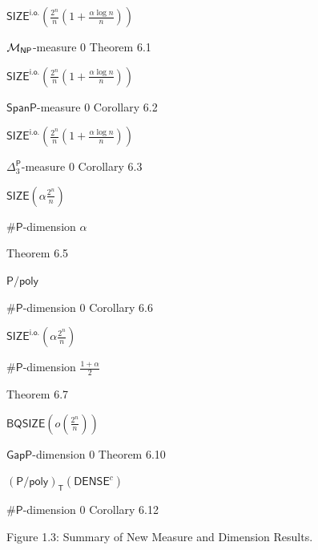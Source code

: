 $\mathsf{SIZE}^{\mathsf{i.o.}}\!\!\left(\frac{2^{n}}{n}\!\left(1+\frac{\alpha\log n}{n}\right)\right)$ 

${{\cal M}_{\mathsf{NP}}}$-measure 0 
Theorem 6.1
 
\par




$\mathsf{SIZE}^{\mathsf{i.o.}}\!\!\left(\frac{2^{n}}{n}\!\left(1+\frac{\alpha\log n}{n}\right)\right)$ 

$\mathsf{SpanP}$-measure 0 
Corollary 6.2
 
\par


$\mathsf{SIZE}^{\mathsf{i.o.}}\!\!\left(\frac{2^{n}}{n}\!\left(1+\frac{\alpha\log n}{n}\right)\right)$ 

${\Delta^{\mathsf{P}}_{3}}$-measure 0 
Corollary 6.3
 
\par


$\mathsf{SIZE}\!\left(\alpha\frac{2^{n}}{n}\right)$ 

${\mathsf{\#}\mathsf{P}}$-dimension $\alpha$
 
Theorem 6.5
 
\par


${\mathsf{P}/\mathsf{poly}}$ 

${\mathsf{\#}\mathsf{P}}$-dimension 0 
Corollary 6.6
 
\par


$\mathsf{SIZE}^{\mathsf{i.o.}}\!\!\left(\alpha\frac{2^{n}}{n}\right)$ 

${\mathsf{\#}\mathsf{P}}$-dimension $\frac{1+\alpha}{2}$
 
Theorem 6.7
 
\par


$\mathsf{BQSIZE}\left(o\left(\frac{2^{n}}{n}\right)\right)$ 

$\mathsf{GapP}$-dimension 0 
Theorem 6.10
 
\par


$({\mathsf{P}/\mathsf{poly}})_{\mathsf{T}}(\mathsf{DENSE}^{c})$ 

${\mathsf{\#}\mathsf{P}}$-dimension 0 
Corollary 6.12
 
\par




Figure 1.3: Summary of New Measure and Dimension Results.




